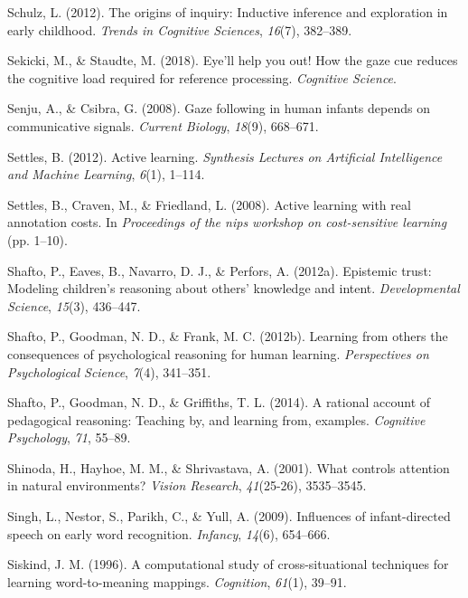 \documentclass[oneside]{report}
\begin{document}
\hypertarget{ref-schulz2012origins}{}
Schulz, L. (2012). The origins of inquiry: Inductive inference and
exploration in early childhood. \emph{Trends in Cognitive Sciences},
\emph{16}(7), 382--389.

\hypertarget{ref-sekicki2018eye}{}
Sekicki, M., \& Staudte, M. (2018). Eye'll help you out! How the gaze
cue reduces the cognitive load required for reference processing.
\emph{Cognitive Science}.

\hypertarget{ref-senju2008gaze}{}
Senju, A., \& Csibra, G. (2008). Gaze following in human infants depends
on communicative signals. \emph{Current Biology}, \emph{18}(9),
668--671.

\hypertarget{ref-settles2012active}{}
Settles, B. (2012). Active learning. \emph{Synthesis Lectures on
Artificial Intelligence and Machine Learning}, \emph{6}(1), 1--114.

\hypertarget{ref-settles2008active}{}
Settles, B., Craven, M., \& Friedland, L. (2008). Active learning with
real annotation costs. In \emph{Proceedings of the nips workshop on
cost-sensitive learning} (pp. 1--10).

\hypertarget{ref-shafto2012epistemic}{}
Shafto, P., Eaves, B., Navarro, D. J., \& Perfors, A. (2012a). Epistemic
trust: Modeling children's reasoning about others' knowledge and intent.
\emph{Developmental Science}, \emph{15}(3), 436--447.

\hypertarget{ref-shafto2012learning}{}
Shafto, P., Goodman, N. D., \& Frank, M. C. (2012b). Learning from
others the consequences of psychological reasoning for human learning.
\emph{Perspectives on Psychological Science}, \emph{7}(4), 341--351.

\hypertarget{ref-shafto2014rational}{}
Shafto, P., Goodman, N. D., \& Griffiths, T. L. (2014). A rational
account of pedagogical reasoning: Teaching by, and learning from,
examples. \emph{Cognitive Psychology}, \emph{71}, 55--89.

\hypertarget{ref-shinoda2001controls}{}
Shinoda, H., Hayhoe, M. M., \& Shrivastava, A. (2001). What controls
attention in natural environments? \emph{Vision Research},
\emph{41}(25-26), 3535--3545.

\hypertarget{ref-singh2009influences}{}
Singh, L., Nestor, S., Parikh, C., \& Yull, A. (2009). Influences of
infant-directed speech on early word recognition. \emph{Infancy},
\emph{14}(6), 654--666.

\hypertarget{ref-siskind1996computational}{}
Siskind, J. M. (1996). A computational study of cross-situational
techniques for learning word-to-meaning mappings. \emph{Cognition},
\emph{61}(1), 39--91.
\end{document}
